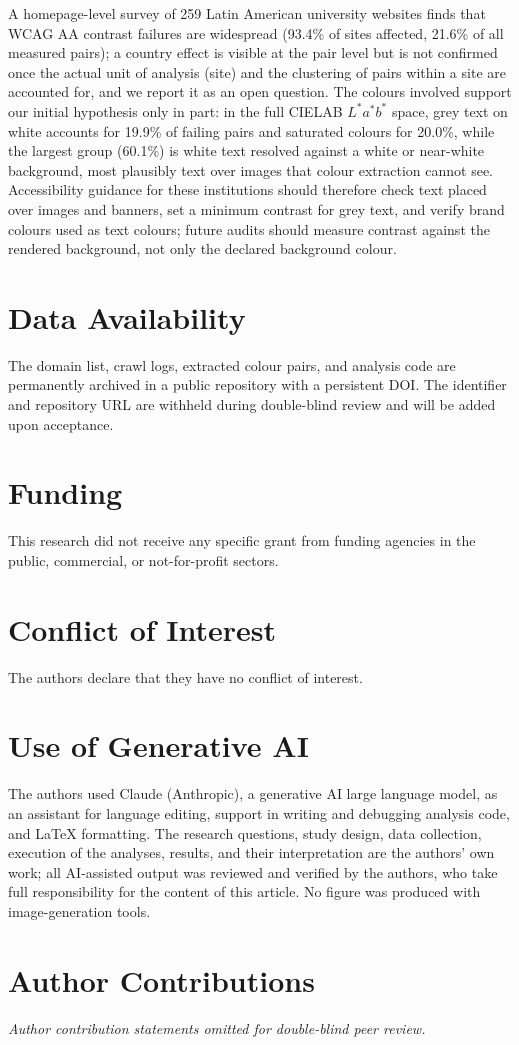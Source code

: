 \documentclass[10pt]{article}
\begin{document}
A homepage-level survey of 259 Latin American university websites finds that WCAG AA contrast failures are widespread (93.4\% of sites affected, 21.6\% of all measured pairs); a country effect is visible at the pair level but is not confirmed once the actual unit of analysis (site) and the clustering of pairs within a site are accounted for, and we report it as an open question. The colours involved support our initial hypothesis only in part: in the full CIELAB $L^*a^*b^*$ space, grey text on white accounts for 19.9\% of failing pairs and saturated colours for 20.0\%, while the largest group (60.1\%) is white text resolved against a white or near-white background, most plausibly text over images that colour extraction cannot see. Accessibility guidance for these institutions should therefore check text placed over images and banners, set a minimum contrast for grey text, and verify brand colours used as text colours; future audits should measure contrast against the rendered background, not only the declared background colour.

\section*{Data Availability}
The domain list, crawl logs, extracted colour pairs, and analysis code are permanently archived in a public repository with a persistent DOI. The identifier and repository URL are withheld during double-blind review and will be added upon acceptance.

\section*{Funding}
This research did not receive any specific grant from funding agencies in the public, commercial, or not-for-profit sectors.

\section*{Conflict of Interest}
The authors declare that they have no conflict of interest.

\section*{Use of Generative AI}
The authors used Claude (Anthropic), a generative AI large language model, as an assistant for language editing, support in writing and debugging analysis code, and LaTeX formatting. The research questions, study design, data collection, execution of the analyses, results, and their interpretation are the authors' own work; all AI-assisted output was reviewed and verified by the authors, who take full responsibility for the content of this article. No figure was produced with image-generation tools.

\section*{Author Contributions}
\textit{Author contribution statements omitted for double-blind peer review.}



\end{document}
